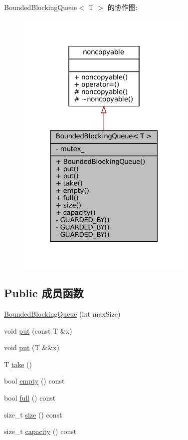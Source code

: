 Bounded\+Blocking\+Queue$<$ T $>$ 的协作图\+:
\nopagebreak
\begin{figure}[H]
\begin{center}
\leavevmode
\includegraphics[width=241pt]{classmuduo_1_1BoundedBlockingQueue__coll__graph}
\end{center}
\end{figure}
\subsection*{Public 成员函数}
\begin{DoxyCompactItemize}
\item 
\hyperlink{classmuduo_1_1BoundedBlockingQueue_a2fe33813e688d6e4afd6c3505e70fcbb}{Bounded\+Blocking\+Queue} (int max\+Size)
\item 
void \hyperlink{classmuduo_1_1BoundedBlockingQueue_a9b315be92f51608e0d347f1fe77b8e3f}{put} (const T \&x)
\item 
void \hyperlink{classmuduo_1_1BoundedBlockingQueue_ae3d9a92b70266faafd1600ba3442607d}{put} (T \&\&x)
\item 
T \hyperlink{classmuduo_1_1BoundedBlockingQueue_a926c690dfed431d9d806584f3d996e07}{take} ()
\item 
bool \hyperlink{classmuduo_1_1BoundedBlockingQueue_a644718bb2fb240de962dc3c9a1fdf0dc}{empty} () const
\item 
bool \hyperlink{classmuduo_1_1BoundedBlockingQueue_a8abf3cf65268916fe1f1660fd9efd90a}{full} () const
\item 
size\+\_\+t \hyperlink{classmuduo_1_1BoundedBlockingQueue_a259cb5a711406a8c3e5d937eb9350cca}{size} () const
\item 
size\+\_\+t \hyperlink{classmuduo_1_1BoundedBlockingQueue_a7223528283cd4e5872e0cc716bf9bd9d}{capacity} () const
\end{DoxyCompactItemize}
